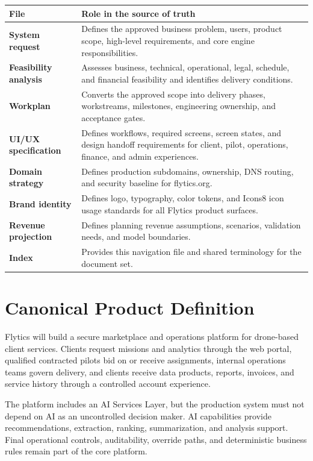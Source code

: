 \documentclass[11pt,a4paper]{article}
\begin{document}
\begin{longtable}{>{\bfseries}p{}p{}}
\toprule
File & Role in the source of truth \\
\midrule
System request & Defines the approved business problem, users, product scope, high-level requirements, and core engine responsibilities. \\
Feasibility analysis & Assesses business, technical, operational, legal, schedule, and financial feasibility and identifies delivery conditions. \\
Workplan & Converts the approved scope into delivery phases, workstreams, milestones, engineering ownership, and acceptance gates. \\
UI/UX specification & Defines workflows, required screens, screen states, and design handoff requirements for client, pilot, operations, finance, and admin experiences. \\
Domain strategy & Defines production subdomains, ownership, DNS routing, and security baseline for flytics.org. \\
Brand identity & Defines logo, typography, color tokens, and Icons8 icon usage standards for all Flytics product surfaces. \\
Revenue projection & Defines planning revenue assumptions, scenarios, validation needs, and model boundaries. \\
Index & Provides this navigation file and shared terminology for the document set. \\
\bottomrule
\end{longtable}

\section{Canonical Product Definition}

Flytics will build a secure marketplace and operations platform for drone-based client services. Clients request missions and analytics through the web portal, qualified contracted pilots bid on or receive assignments, internal operations teams govern delivery, and clients receive data products, reports, invoices, and service history through a controlled account experience.

The platform includes an AI Services Layer, but the production system must not depend on AI as an uncontrolled decision maker. AI capabilities provide recommendations, extraction, ranking, summarization, and analysis support. Final operational controls, auditability, override paths, and deterministic business rules remain part of the core platform.
\end{document}
